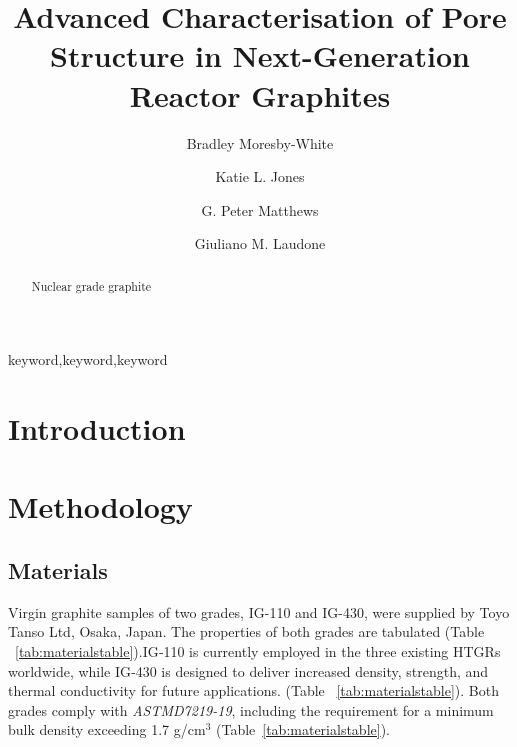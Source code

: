 \documentclass[3p,twocolumn]{elsarticle}
\begin{document}
\begin{frontmatter}
\title{Advanced Characterisation of Pore Structure in Next-Generation Reactor Graphites}
\author[plym]{Bradley Moresby-White}
\author[plym]{Katie L. Jones}
\author[plym]{G. Peter Matthews}
\author[plym]{Giuliano M. Laudone}
\address[plym]{Faculty of Science and Engineering, University of Plymouth, Plymouth, UK}
\begin{abstract}
Nuclear grade graphite
\end{abstract}
\begin{keyword}keyword\sep keyword\sep keyword\end{keyword}
\end{frontmatter}
\section{Introduction}
\section{Methodology}

\subsection{Materials}

Virgin graphite samples of two grades, IG-110 and IG-430, were supplied by Toyo
Tanso Ltd\texttrademark{}, Osaka, Japan. The properties of both grades are
tabulated (Table ~\ref{tab:materialstable}).IG‑110 is currently employed in the
three existing HTGRs worldwide, while IG‑430 is designed to deliver increased
density, strength, and thermal conductivity for future
applications.\citep{toyotanso_atomic_nuclear} (Table ~\ref{tab:materialstable}).
Both grades comply with \textit{ASTMD7219-19}, including the requirement for a
minimum bulk density exceeding 1.7 g/cm$^3$ \citep{ASTMD7219-19}
(Table~\ref{tab:materialstable}). 
\begin{table}
  \centering
  \caption{Manufacturer dataset for IG-110 and IG-430 \citep{Jones2018}}
  \label{tab:materialstable}
\end{table}
\end{document}
